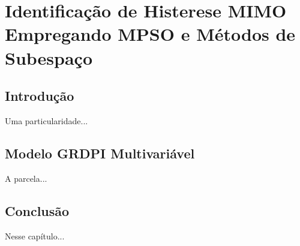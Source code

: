 \chapter{Identificação de Histerese \acs{MIMO} Empregando \acs{MPSO} e Métodos de Subespaço}
\label{cap:res2} \vspace{-1cm} \vspace{1cm}
%
\section{Introdução}  
%
\label{sec:res2_intro}
%
\par
Uma particularidade...

\section{Modelo \acs{GRDPI} Multivariável} 
\label{sec:grdpimulti}
\par 
A parcela...
%
\section{Conclusão} 
\label{sec:conc}
Nesse capítulo...

%
\clearpage
%


